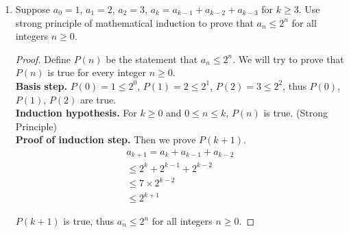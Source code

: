 \documentclass[12pt,a4paper]{article}
\theoremstyle{definition}
\numberwithin{equation}{section}
\numberwithin{figure}{section}
\begin{document}
\begin{enumerate}
\begin{proof}
\begin{gather*}
k = i_{k-1} \times 4 + j_{k-1} \times 7 + 1 \\ 
\Leftrightarrow \quad k = (i_{k-1}+2) \times 4 + (j_{k-1}-1) \times 7\\
\Leftrightarrow \quad k = (i_{k-1}-5) \times 4 + (j_{k-1}+1) \times 7
\end{gather*}

(1) If $j_{k-1} \ge 1$, denote $i_k = i_{k-1}+2$, $j_k = j_{k-1}-1$, then we know $i_k > i_{k-1} \ge 0$, $j_k = j_{k-1}-1 \ge 0$. Thus $n = i_n \times 4 + j_n \times 7$ is still true, we have derived a contradiction. \\
(2) If $j_{k-1}-1 = 0$, then we know $i_{k-1} = (k-1) / 4 \ge 5$, denote $i_k = i_{k-1}-5$, $j_k = j_{k-1}+1$. We can get $i_k = i_{k-1}-5 \ge 0$ and $j_k = j_{k-1}+1\ge 0$. Thus $n = i_n \times 4 + j_n \times 7$ is still true, we have derived a contradiction. \\
In conclusion, for every integer $n>17$, there exist integers $i_n\ge 0$ and $j_n\ge 0$, such that $n = i_n \times 4 + j_n \times 7$.

\end{proof}

\item Suppose $a_0=1$, $a_1=2$, $a_2=3$, $a_k=a_{k-1}+a_{k-2}+a_{k-3}$ for $k \ge 3$. Use strong principle of mathematical induction to prove that $a_n \le 2^n$ for all integers $n\ge 0$.

\begin{proof} Define $P(n)$ be the statement that $a_n \le 2^n$. We will try to prove that $P(n)$ is true for every integer $n \ge 0$. \\
\textbf{Basis step.} $P(0) = 1 \le 2^0$, $P(1) = 2 \le 2^1$, $P(2) = 3 \le 2^2$, thus $P(0)$, $P(1)$, $P(2)$ are true. \\
\textbf{Induction hypothesis.} For $k \ge 0$ and $0 \le n \le k$, $P(n)$ is true. (Strong Principle) \\
\textbf{Proof of induction step.} Then we prove $P(k+1)$. \\

\begin{align*}
a_{k+1} =a_{k}+a_{k-1}+a_{k-2} \\
\le 2^k+2^{k-1}+2^{k-2} \\
\le 7 \times 2^{k-2} \\
\le 2^{k+1}
\end{align*}

$P(k+1)$ is true, thus $a_n \le 2^n$ for all integers $n\ge 0$.
\end{proof}


\end{enumerate}
\end{document}
